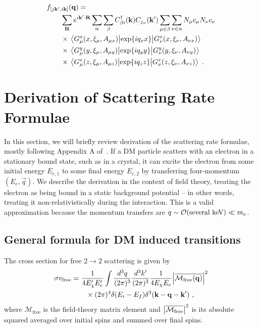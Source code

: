 \documentclass[
    prd, twocolumn, superscriptaddress, nofootinbib, amsmath, amssymb,
    aps, floatfix,preprintnumbers
]{revtex4-2}
\begin{document}
    \begin{equation}
        \begin{split}
            &f_{\left[j\mathbf{k}^\prime,i\mathbf{k}\right]}(\mathbf{q}) = \\
            &\qquad\sum_\mathbf{R}e^{i\mathbf{k}^\prime\cdot\mathbf{R}} \sum_{\alpha}\sum_\beta C^\dagger_{\beta i}(\mathbf{k})C_{j_\alpha}(\mathbf{k}^\prime)\sum_{\mu \in \beta}\sum_{\nu \in \alpha} N_\mu c_\mu N_\nu c_\nu\\
            &\qquad\times\mel{G_\mu^x (x, \xi_\mu, A_{\mu x})}{\exp{i q_x x}}{G_\nu^x (x, \xi_\nu, A_{\nu x})}\\
            &\qquad\times\mel{G_\mu^y (y, \xi_\mu, A_{\mu y})}{\exp{i q_y y}}{G_\nu^y (y, \xi_\nu, A_{\nu y})}\\
            &\qquad\times\mel{G_\mu^z (z, \xi_\mu, A_{\mu z})}{\exp{i q_z z}}{G_\nu^z (z, \xi_\nu, A_{\nu z})}\ .
        \end{split}
    \end{equation}
    
\section{Derivation of Scattering Rate Formulae}\label{app:derivation}
    
    In this section, we will briefly review derivation of the scattering rate formulae, mostly following Appendix A of~\cite{Essig:2015cda}. If a DM particle scatters with an electron in a stationary bound state, such as in a crystal, it can excite the electron from some initial energy $E_{e,1}$ to some final energy $E_{e,2}$ by transferring four-momentum $(E_e, \Vec{q})$. We describe the derivation in the context of field theory, treating the electron as being bound in a static background potential -- in other words, treating it non-relativistically during the interaction. This is a valid approximation because the momentum transfers are $q \sim \order{\text{several keV}} \ll m_e$. 
    
    \subsection{General formula for DM induced transitions}
        The cross section for free $2\longrightarrow2$ scattering is given by
        \begin{equation}
            \begin{split}
                \sigma v_\mathrm{free} =&\ \frac{1}{4E_\chi^\prime E_e^\prime}\int\frac{d^3q}{(2\pi)^3}\frac{d^3k^\prime}{(2\pi)^3}\frac{1}{4E_\chi E_e}\abs{\overline{\mathcal{M}_\mathrm{free}(\mathbf{q})}}^2\\
                &\ \ \ \times(2\pi)^4\delta(E_i - E_f)\delta^3(\mathbf{k-q-k}^\prime)\ ,
            \end{split}
        \end{equation}
        where $\mathcal{M}_\mathrm{free}$ is the field-theory matrix element and $\abs{\overline{\mathcal{M}_\mathrm{free}}}^2$ is its absolute squared averaged over initial spins and summed over final spins.
        
\end{document}
